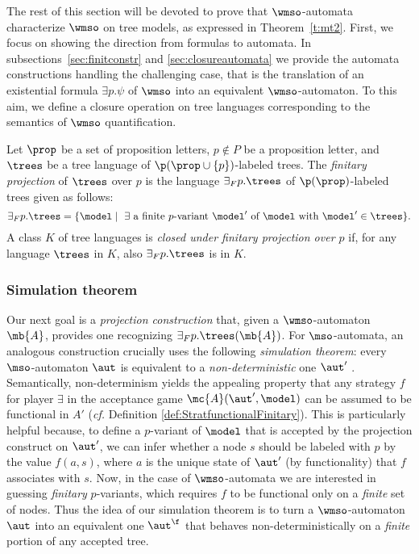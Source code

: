 

The rest of this section will be devoted to prove that $\wmso$-automata
characterize $\wmso$ on tree models, as expressed in Theorem~\ref{t:mt2}.
First, we focus on showing the direction from formulas to automata.
In subsections~\ref{sec:finitconstr} and \ref{sec:closureautomata} we provide
the automata constructions handling the challenging case, that is the
translation of an existential formula $\exists p.\psi$ of $\wmso$ into an
equivalent $\wmso$-automaton.
To this aim, we define a closure operation on tree languages corresponding
to the semantics of $\wmso$ quantification.

\begin{definition}\label{def:tree_finproj}
Let $\prop$ be a set of proposition letters, $p \not\in P$ be a proposition letter, and $\trees$ be a tree language of $\p (\prop\cup\{p\})$-labeled
trees.
The \emph{finitary projection} of $\trees$ over $p$ is the language
${\exists}_F p.\trees$ of $\p (\prop)$-labeled trees %
given as follows:
%
$$
{\exists}_F p.\trees = \{\model \mid \text{ $\exists$ a finite $p$-variant } \model' \text{ of } \model \text{ with } \model' \in \trees\}.
$$
%
A class $K$ of tree languages is \emph{closed under finitary projection
over $p$} if, for any language $\trees$ in $K$, also ${{\exists}_F p}.\trees$ is in $K$.
\end{definition} 

\subsubsection{Simulation theorem}


\noindent Our next goal is a \emph{projection construction} that, given
a $\wmso$-automaton $\mb{A}$, provides one recognizing ${{\exists}_F p}.\trees(\mb{A})$. For $\mso$-automata, an analogous construction crucially uses the following \emph{simulation theorem}: every
$\mso$-automaton $\aut$ is equivalent to a \emph{non-deterministic} one $\aut'$ \cite{Walukiewicz96}.
Semantically, non-determinism yields the appealing property that any strategy $f$ for player $\exists$ in the acceptance game $\mc{A}(\aut',\model)$ can be assumed to be functional in $A'$ (\emph{cf.} Definition \ref{def:StratfunctionalFinitary}).
This is particularly helpful because, to define a $p$-variant of $\model$
that is accepted by the projection construct on $\aut'$, we
can infer whether a node $s$ should be labeled with $p$ by the value $f(a,s)$, where $a$ is the unique state of $\aut'$ (by functionality) that $f$ associates with $s$. Now, in the case of $\wmso$-automata we are interested in guessing
\emph{finitary} $p$-variants, which requires $f$ to be functional only on a \emph{finite} set of nodes. Thus the idea of our simulation theorem is to turn a $\wmso$-automaton $\aut$ into an equivalent one $\aut^{\f}$ that behaves non-deterministically on a \emph{finite} portion of any accepted tree.

